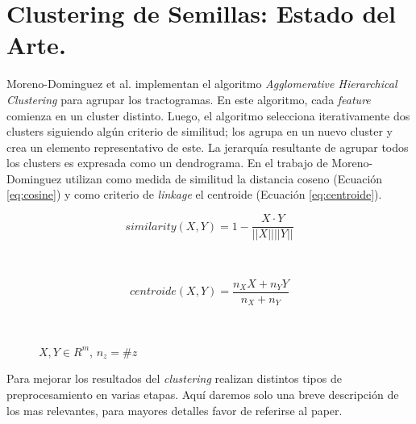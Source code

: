 \section{Clustering de Semillas: Estado del Arte.}

Moreno-Dominguez et al. \cite{Moreno-Dominguez2014} implementan el algoritmo
\textit{Agglomerative Hierarchical Clustering} para agrupar los tractogramas. 
En este algoritmo, cada \textit{feature} comienza en un cluster distinto. Luego,
el algoritmo selecciona iterativamente dos clusters siguiendo alg\'un criterio
de similitud; los agrupa en un nuevo cluster y crea un elemento representativo
de este. La jerarqu\'ia resultante de agrupar todos los clusters es expresada
como un dendrograma. En el trabajo de Moreno-Dominguez utilizan como medida de
similitud la distancia coseno (Ecuaci\'on \ref{eq:cosine}) y como criterio de
\textit{linkage} el centroide (Ecuaci\'on \ref{eq:centroide}).

\begin{figure}[h!]
                                                                                                                        
\begin{minipage}[b]{0.49\textwidth}
    \begin{equation}
        \label{eq:cosine}
        similarity(X,Y) = 1 - \frac{ X \cdot Y }{||X|| ||Y||}
    \end{equation}
\end{minipage} ~
\hfill
\begin{minipage}[b]{0.49\textwidth}
    \begin{equation}
        \label{eq:centroide}
        centroide(X,Y) = \frac{ n_X X + n_Y Y}{n_X + n_Y}
    \end{equation}
\end{minipage} ~

\centering
\vspace{0.5cm}
\small{$X, Y \in R^m$, $n_z = \#z$}

\end{figure}  

Para mejorar los resultados del \textit{clustering} realizan distintos tipos de
preprocesamiento en varias etapas. Aqu\'i daremos solo una breve descripci\'on 
de los mas relevantes, para mayores detalles favor de referirse al paper. \\

